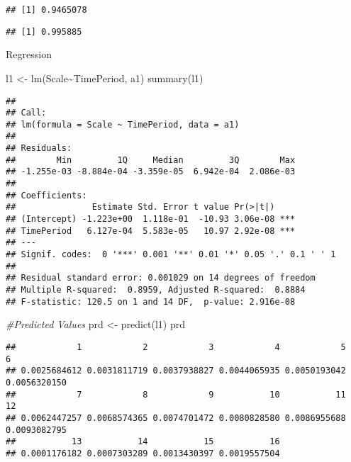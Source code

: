 \documentclass[
]{article}
\newenvironment{Shaded}{\begin{snugshade}}{\end{snugshade}}
\newcommand{\CommentTok}[1]{\textcolor[rgb]{0.56,0.35,0.01}{\textit{#1}}}
\newcommand{\FunctionTok}[1]{\textcolor[rgb]{0.00,0.00,0.00}{#1}}
\newcommand{\NormalTok}[1]{#1}
\newcommand{\OtherTok}[1]{\textcolor[rgb]{0.56,0.35,0.01}{#1}}
\newcommand{\SpecialCharTok}[1]{\textcolor[rgb]{0.00,0.00,0.00}{#1}}
\begin{document}
\begin{verbatim}
## [1] 0.9465078
\end{verbatim}

\begin{Shaded}
\end{Shaded}

\begin{verbatim}
## [1] 0.995885
\end{verbatim}

Regression

\begin{Shaded}
\begin{Highlighting}[]
\NormalTok{l1 }\OtherTok{\textless{}{-}} \FunctionTok{lm}\NormalTok{(Scale}\SpecialCharTok{\textasciitilde{}}\NormalTok{TimePeriod, a1)}
\FunctionTok{summary}\NormalTok{(l1)}
\end{Highlighting}
\end{Shaded}

\begin{verbatim}
## 
## Call:
## lm(formula = Scale ~ TimePeriod, data = a1)
## 
## Residuals:
##        Min         1Q     Median         3Q        Max 
## -1.255e-03 -8.884e-04 -3.359e-05  6.942e-04  2.086e-03 
## 
## Coefficients:
##               Estimate Std. Error t value Pr(>|t|)    
## (Intercept) -1.223e+00  1.118e-01  -10.93 3.06e-08 ***
## TimePeriod   6.127e-04  5.583e-05   10.97 2.92e-08 ***
## ---
## Signif. codes:  0 '***' 0.001 '**' 0.01 '*' 0.05 '.' 0.1 ' ' 1
## 
## Residual standard error: 0.001029 on 14 degrees of freedom
## Multiple R-squared:  0.8959, Adjusted R-squared:  0.8884 
## F-statistic: 120.5 on 1 and 14 DF,  p-value: 2.916e-08
\end{verbatim}

\begin{Shaded}
\begin{Highlighting}[]
\CommentTok{\#Predicted Values}
\NormalTok{prd }\OtherTok{\textless{}{-}} \FunctionTok{predict}\NormalTok{(l1)}
\NormalTok{prd}
\end{Highlighting}
\end{Shaded}

\begin{verbatim}
##            1            2            3            4            5            6 
## 0.0025684612 0.0031811719 0.0037938827 0.0044065935 0.0050193042 0.0056320150 
##            7            8            9           10           11           12 
## 0.0062447257 0.0068574365 0.0074701472 0.0080828580 0.0086955688 0.0093082795 
##           13           14           15           16 
## 0.0001176182 0.0007303289 0.0013430397 0.0019557504
\end{verbatim}
\end{document}
